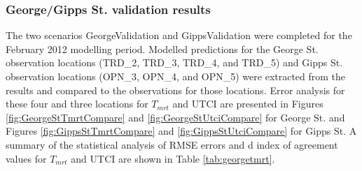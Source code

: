 \documentclass[final,3p,times,authoryear]{elsarticle}
\begin{document}
\subsubsection{George/Gipps St. validation results}





The two scenarios GeorgeValidation and GippsValidation were completed for the February 2012 modelling period. Modelled predictions for the George St. observation locations (TRD\_2, TRD\_3, TRD\_4, and TRD\_5) and Gipps St. observation locations (OPN\_3, OPN\_4, and OPN\_5) were extracted from the results and compared to the observations for those locations. Error analysis for these four and three locations for $T_{mrt}$ and UTCI are presented in Figures \ref{fig:GeorgeStTmrtCompare} and \ref{fig:GeorgeStUtciCompare} for George St. and Figures \ref{fig:GippsStTmrtCompare} and \ref{fig:GippsStUtciCompare} for Gipps St. A summary of the statistical analysis of RMSE errors and d index of agreement values for $T_{mrt}$ and UTCI are shown in Table \ref{tab:georgetmrt}. 
\end{document}
